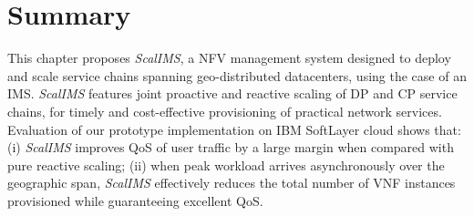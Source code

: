 \section{Summary}\label{sec:scalims-conclusion}

This chapter proposes \textit{ScalIMS}, a NFV management system designed to deploy and scale service chains spanning geo-distributed datacenters, using the case of an IMS. \textit{ScalIMS} features joint proactive and reactive scaling of DP and CP service chains, for timely and cost-effective provisioning of practical network services. Evaluation of our prototype implementation on IBM SoftLayer cloud shows that: (i) \textit{ScalIMS} improves QoS of user traffic by a large margin when compared with pure reactive scaling; (ii) when peak workload arrives asynchronously over the geographic span, \textit{ScalIMS} effectively reduces the total number of VNF instances provisioned while guaranteeing excellent QoS. %


